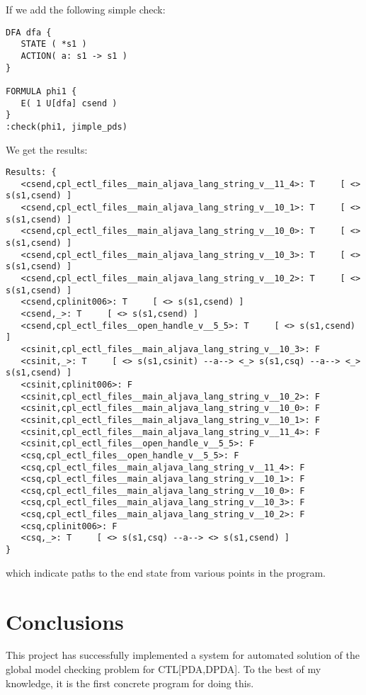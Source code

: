 \documentclass[11pt]{article}
\theoremstyle{definition}
\begin{document}
If we add the following simple check:
\footnotesize
\begin{verbatim}
DFA dfa {
   STATE ( *s1 )
   ACTION( a: s1 -> s1 )
}

FORMULA phi1 {
   E( 1 U[dfa] csend )
}
:check(phi1, jimple_pds)
\end{verbatim}
\normalsize
We get the results:
\footnotesize
\begin{verbatim}
Results: {
   <csend,cpl_ectl_files__main_aljava_lang_string_v__11_4>: T     [ <> s(s1,csend) ]
   <csend,cpl_ectl_files__main_aljava_lang_string_v__10_1>: T     [ <> s(s1,csend) ]
   <csend,cpl_ectl_files__main_aljava_lang_string_v__10_0>: T     [ <> s(s1,csend) ]
   <csend,cpl_ectl_files__main_aljava_lang_string_v__10_3>: T     [ <> s(s1,csend) ]
   <csend,cpl_ectl_files__main_aljava_lang_string_v__10_2>: T     [ <> s(s1,csend) ]
   <csend,cplinit006>: T     [ <> s(s1,csend) ]
   <csend,_>: T     [ <> s(s1,csend) ]
   <csend,cpl_ectl_files__open_handle_v__5_5>: T     [ <> s(s1,csend) ]
   <csinit,cpl_ectl_files__main_aljava_lang_string_v__10_3>: F
   <csinit,_>: T     [ <> s(s1,csinit) --a--> <_> s(s1,csq) --a--> <_> s(s1,csend) ]
   <csinit,cplinit006>: F
   <csinit,cpl_ectl_files__main_aljava_lang_string_v__10_2>: F
   <csinit,cpl_ectl_files__main_aljava_lang_string_v__10_0>: F
   <csinit,cpl_ectl_files__main_aljava_lang_string_v__10_1>: F
   <csinit,cpl_ectl_files__main_aljava_lang_string_v__11_4>: F
   <csinit,cpl_ectl_files__open_handle_v__5_5>: F
   <csq,cpl_ectl_files__open_handle_v__5_5>: F
   <csq,cpl_ectl_files__main_aljava_lang_string_v__11_4>: F
   <csq,cpl_ectl_files__main_aljava_lang_string_v__10_1>: F
   <csq,cpl_ectl_files__main_aljava_lang_string_v__10_0>: F
   <csq,cpl_ectl_files__main_aljava_lang_string_v__10_3>: F
   <csq,cpl_ectl_files__main_aljava_lang_string_v__10_2>: F
   <csq,cplinit006>: F
   <csq,_>: T     [ <> s(s1,csq) --a--> <> s(s1,csend) ]
}
\end{verbatim}
\normalsize
which indicate paths to the end state from various points in the program.

\section{Conclusions}

This project has successfully implemented a system for automated solution of
the global model checking problem for CTL[PDA,DPDA]. To the best of my
knowledge, it is the first concrete program for doing this.
\end{document}

